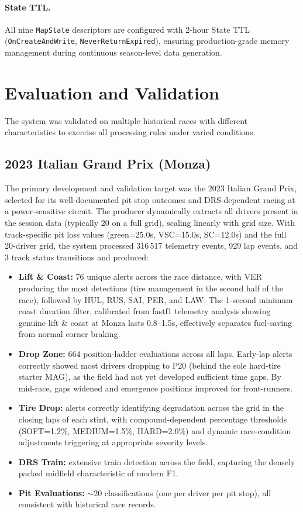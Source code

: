 \documentclass[a4paper,twocolumn]{article}
\begin{document}
\paragraph{State TTL.}
All nine \texttt{MapState} descriptors are configured with 2-hour
State TTL (\texttt{OnCreateAndWrite}, \texttt{NeverReturnExpired}),
ensuring production-grade memory management during continuous
season-level data generation.

\section{Evaluation and Validation}

The system was validated on multiple historical races with different
characteristics to exercise all processing rules under varied conditions.

\subsection{2023 Italian Grand Prix (Monza)}

The primary development and validation target was the 2023 Italian Grand
Prix, selected for its well-documented pit stop outcomes and DRS-dependent
racing at a power-sensitive circuit. The producer dynamically extracts all
drivers present in the session data (typically 20 on a full grid), scaling
linearly with grid size. With track-specific pit loss values
(green=25.0s, VSC=15.0s, SC=12.0s) and the full 20-driver grid, the
system processed 316\,517 telemetry events, 929 lap events, and 3 track
status transitions and produced:
\begin{itemize}
  \item \textbf{Lift \& Coast:} 76 unique alerts across the race
    distance, with VER producing the most detections (tire management
    in the second half of the race), followed by HUL, RUS, SAI, PER,
    and LAW. The 1-second minimum coast duration filter, calibrated
    from fastf1 telemetry analysis showing genuine lift \& coast at
    Monza lasts 0.8--1.5s, effectively separates fuel-saving from
    normal corner braking.
  \item \textbf{Drop Zone:} 664 position-ladder evaluations across all
    laps. Early-lap alerts correctly showed most drivers dropping to
    P20 (behind the sole hard-tire starter MAG), as the field had not
    yet developed sufficient time gaps. By mid-race, gaps widened
    and emergence positions improved for front-runners.
  \item \textbf{Tire Drop:} alerts correctly identifying degradation
    across the grid in the closing laps of each stint, with compound-dependent
    percentage thresholds (SOFT=1.2\%, MEDIUM=1.5\%, HARD=2.0\%)
    and dynamic race-condition adjustments triggering at
    appropriate severity levels.
  \item \textbf{DRS Train:} extensive train detection across the field,
    capturing the densely packed midfield characteristic of modern F1.
  \item \textbf{Pit Evaluations:} $\sim$20 classifications (one per
    driver per pit stop), all consistent with historical race records.
\end{itemize}
\end{document}
